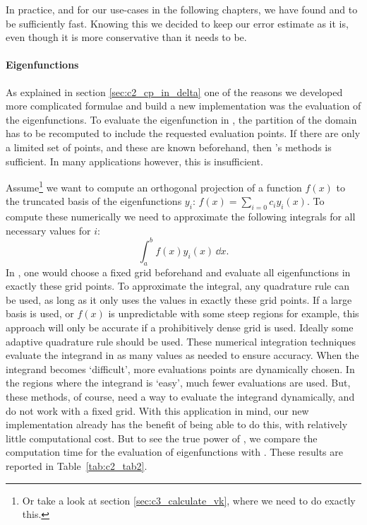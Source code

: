 In practice, and for our use-cases in the following chapters, we have found  and \pyslise{} to be sufficiently fast. Knowing this we decided to keep our error estimate as it is, even though it is more conservative than it needs to be.

\paragraph{Eigenfunctions} As explained in section \ref{sec:c2_cp_in_delta} one of the reasons we developed more complicated formulae and build a new implementation was the evaluation of the eigenfunctions. To evaluate the eigenfunction in , the partition of the domain has to be recomputed to include the requested evaluation points. If there are only a limited set of points, and these are known beforehand, then 's methods is sufficient. In many applications however, this is insufficient.

Assume\footnote{Or take a look at section \ref{sec:c3_calculate_vk}, where we need to do exactly this.} we want to compute an orthogonal projection of a function $f(x)$ to the truncated basis of the eigenfunctions $y_i$: $ f(x) = \sum_{i = 0} c_i y_i(x)$.
To compute these numerically we need to approximate the following integrals for all necessary values for $i$:
$$
\int_a^b f(x) y_i(x)\,\dd x\text{.}
$$
In , one would choose a fixed grid beforehand and evaluate all eigenfunctions in exactly these grid points. To approximate the integral, any quadrature rule can be used, as long as it only uses the values in exactly these grid points. If a large basis is used, or $f(x)$ is unpredictable with some steep regions for example, this approach will only be accurate if a prohibitively dense grid is used. Ideally some adaptive quadrature rule should be used. These numerical integration techniques evaluate the integrand in as many values as needed to ensure accuracy. When the integrand becomes `difficult', more evaluations points are dynamically chosen. In the regions where the integrand is `easy', much fewer evaluations are used. But, these methods, of course, need a way to evaluate the integrand dynamically, and do not work with a fixed grid. With this application in mind, our new implementation already has the benefit of being able to do this, with relatively little computational cost. But to see the true power of , we compare the computation time for the evaluation of eigenfunctions with . These results are reported in Table~\ref{tab:c2_tab2}.

